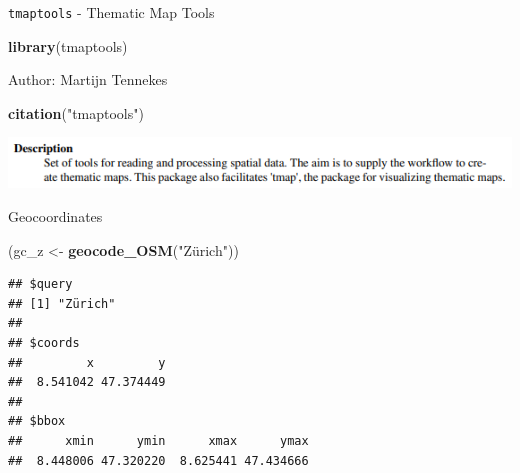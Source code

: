\documentclass[
  ignorenonframetext,
]{beamer}
\newenvironment{Shaded}{\begin{snugshade}}{\end{snugshade}}
\newcommand{\KeywordTok}[1]{\textcolor[rgb]{0.13,0.29,0.53}{\textbf{#1}}}
\newcommand{\NormalTok}[1]{#1}
\newcommand{\StringTok}[1]{\textcolor[rgb]{0.31,0.60,0.02}{#1}}
\begin{document}
\begin{frame}[fragile]{\texttt{tmaptools} - Thematic Map Tools}
\protect\hypertarget{tmaptools---thematic-map-tools}{}
\begin{Shaded}
\begin{Highlighting}[]
\KeywordTok{library}\NormalTok{(tmaptools)}
\end{Highlighting}
\end{Shaded}

Author: Martijn Tennekes

\begin{Shaded}
\begin{Highlighting}[]
\KeywordTok{citation}\NormalTok{(}\StringTok{"tmaptools"}\NormalTok{)}
\end{Highlighting}
\end{Shaded}

\includegraphics{pics/description_tmaptools.PNG}
\end{frame}

\begin{frame}[fragile]{Geocoordinates}
\protect\hypertarget{geocoordinates}{}
\begin{Shaded}
\begin{Highlighting}[]
\NormalTok{(gc\_z \textless{}{-}}\StringTok{ }\KeywordTok{geocode\_OSM}\NormalTok{(}\StringTok{"Zürich"}\NormalTok{))}
\end{Highlighting}
\end{Shaded}

\begin{verbatim}
## $query
## [1] "Zürich"
## 
## $coords
##         x         y 
##  8.541042 47.374449 
## 
## $bbox
##      xmin      ymin      xmax      ymax 
##  8.448006 47.320220  8.625441 47.434666
\end{verbatim}
\end{frame}
\end{document}
